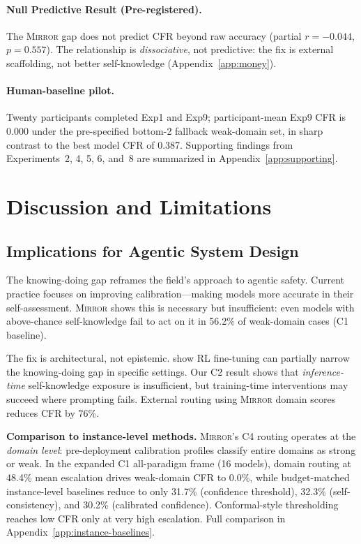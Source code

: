 \documentclass[10pt]{article}
\newcommand{\mirror}{\textsc{Mirror}}
\newcommand{\CFR}{CFR}
\begin{document}
\paragraph{Null Predictive Result (Pre-registered).}
The \mirror{} gap does not predict \CFR{} beyond raw accuracy (partial $r = -0.044$, $p = 0.557$). The relationship is \textit{dissociative}, not predictive: the fix is external scaffolding, not better self-knowledge (Appendix~\ref{app:money}).

\paragraph{Human-baseline pilot.}
Twenty participants completed Exp1 and Exp9; participant-mean Exp9 CFR is 0.000 under the pre-specified bottom-2 fallback weak-domain set, in sharp contrast to the best model CFR of 0.387. Supporting findings from Experiments~2, 4, 5, 6, and~8 are summarized in Appendix~\ref{app:supporting}.

\section{Discussion and Limitations}
\label{sec:discussion}

\subsection{Implications for Agentic System Design}

The knowing-doing gap reframes the field's approach to agentic safety. Current practice focuses on improving calibration---making models more accurate in their self-assessment. \mirror{} shows this is necessary but insufficient: even models with above-chance self-knowledge fail to act on it in 56.2\% of weak-domain cases (C1 baseline).

The fix is architectural, not epistemic. \citet{schmied2026greedy} show RL fine-tuning can partially narrow the knowing-doing gap in specific settings. Our C2 result shows that \emph{inference-time} self-knowledge exposure is insufficient, but training-time interventions may succeed where prompting fails. External routing using \mirror{} domain scores reduces \CFR{} by 76\%.

\textbf{Comparison to instance-level methods.} \mirror{}'s C4 routing operates at the \textit{domain level}: pre-deployment calibration profiles classify entire domains as strong or weak. In the expanded C1 all-paradigm frame (16 models), domain routing at 48.4\% mean escalation drives weak-domain CFR to 0.0\%, while budget-matched instance-level baselines reduce to only 31.7\% (confidence threshold), 32.3\% (self-consistency), and 30.2\% (calibrated confidence). Conformal-style thresholding reaches low CFR only at very high escalation. Full comparison in Appendix~\ref{app:instance-baselines}.
\end{document}
